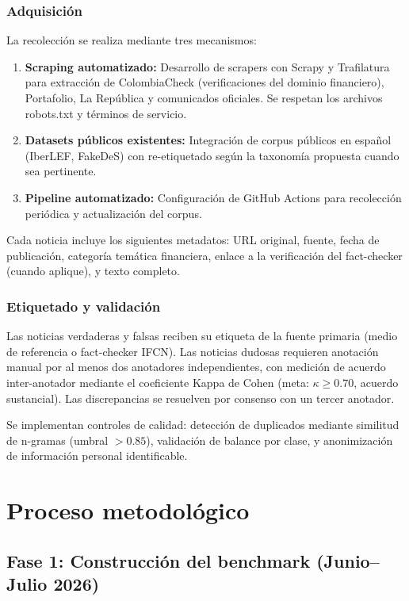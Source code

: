 \subsubsection{Adquisición}

La recolección se realiza mediante tres mecanismos:

\begin{enumerate}
    \item \textbf{Scraping automatizado:} Desarrollo de scrapers con Scrapy y Trafilatura para extracción de ColombiaCheck (verificaciones del dominio financiero), Portafolio, La República y comunicados oficiales. Se respetan los archivos robots.txt y términos de servicio.
    \item \textbf{Datasets públicos existentes:} Integración de corpus públicos en español (IberLEF, FakeDeS) con re-etiquetado según la taxonomía propuesta cuando sea pertinente.
    \item \textbf{Pipeline automatizado:} Configuración de GitHub Actions para recolección periódica y actualización del corpus.
\end{enumerate}

Cada noticia incluye los siguientes metadatos: URL original, fuente, fecha de publicación, categoría temática financiera, enlace a la verificación del fact-checker (cuando aplique), y texto completo.

\subsubsection{Etiquetado y validación}

Las noticias verdaderas y falsas reciben su etiqueta de la fuente primaria (medio de referencia o fact-checker IFCN). Las noticias dudosas requieren anotación manual por al menos dos anotadores independientes, con medición de acuerdo inter-anotador mediante el coeficiente Kappa de Cohen (meta: $\kappa \geq 0.70$, acuerdo sustancial). Las discrepancias se resuelven por consenso con un tercer anotador.

Se implementan controles de calidad: detección de duplicados mediante similitud de n-gramas (umbral $> 0.85$), validación de balance por clase, y anonimización de información personal identificable.

\section{Proceso metodológico}

\subsection{Fase 1: Construcción del benchmark (Junio--Julio 2026)}

